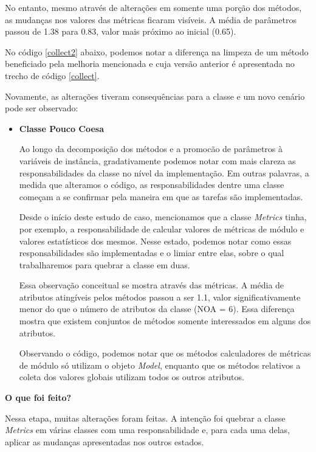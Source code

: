 No entanto, mesmo através de alterações em somente uma porção dos métodos, as
mudanças nos valores das métricas ficaram visíveis. A média de parâmetros passou
de 1.38 para 0.83, valor mais próximo ao inicial (0.65).

No código \ref{collect2} abaixo, podemos notar a diferença na limpeza de um método
beneficiado pela melhoria mencionada e cuja versão anterior é apresentada no trecho
de código \ref{collect}.



Novamente, as alterações tiveram consequências para a classe e um novo cenário pode
ser observado:

\begin{itemize}
\item
\textbf{Classe Pouco Coesa}

Ao longo da decomposição dos métodos e a promocão de parâmetros à variáveis de instância,
gradativamente podemos notar com mais clareza as responsabilidades da classe no nível da
implementação. Em outras palavras, a medida que alteramos o código, as responsabilidades
dentre uma classe começam a se confirmar pela maneira em que as tarefas são implementadas.

Desde o início deste estudo de caso, mencionamos que a classe \textit{Metrics} tinha, por exemplo, a
responsabilidade de calcular valores de métricas de módulo e valores estatísticos dos mesmos.
Nesse estado, podemos notar como essas responsabilidades são implementadas e o limiar entre elas,
sobre o qual trabalharemos para quebrar a classe em duas.

Essa observação conceitual se mostra através das métricas. A média de atributos atingíveis
pelos métodos passou a ser 1.1, valor significativamente menor do que o número de atributos
da classe (NOA = 6). Essa diferença mostra que existem conjuntos de métodos somente interessados
em alguns dos atributos.

Observando o código, podemos notar que os métodos calculadores de métricas de módulo só utilizam
o objeto \textit{Model}, enquanto que os métodos relativos a coleta dos valores globais utilizam
todos os outros atributos.

\end{itemize}


\vskip 0.5cm
\textbf{O que foi feito?}

Nessa etapa, muitas alterações foram feitas. A intenção foi quebrar a classe \textit{Metrics}
em várias classes com uma responsabilidade e, para cada uma delas, aplicar as mudanças apresentadas
nos outros estados.


